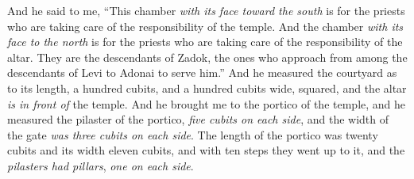 \begin{biblechapter}
\verse And he said to me, “This chamber \textit{with its face toward the south} is for the priests who are taking care of the responsibility of the temple.
\verse And the chamber \textit{with its face to the north} is for the priests who are taking care of the responsibility of the altar. They are the descendants of Zadok, the ones who approach from among the descendants of Levi to Adonai to serve him.”
 And he measured the courtyard as to its length, a hundred cubits, and a hundred cubits wide, squared, and the altar \textit{is in front of} the temple.
\verse And he brought me to the portico of the temple, and he measured the pilaster of the portico, \textit{five cubits on each side}, and the width of the gate \textit{was three cubits on each side}.
\verse The length of the portico was twenty cubits and its width eleven cubits, and with ten steps they went up to it, and the \textit{pilasters had pillars}, \textit{one on each side}.
\end{biblechapter}

